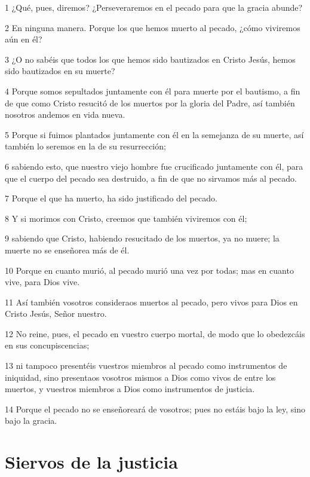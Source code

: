\par 1 ¿Qué, pues, diremos? ¿Perseveraremos en el pecado para que la gracia abunde?
\par 2 En ninguna manera. Porque los que hemos muerto al pecado, ¿cómo viviremos aún en él?
\par 3 ¿O no sabéis que todos los que hemos sido bautizados en Cristo Jesús, hemos sido bautizados en su muerte?
\par 4 Porque somos sepultados juntamente con él para muerte por el bautismo, a fin de que como Cristo resucitó de los muertos por la gloria del Padre, así también nosotros andemos en vida nueva.
\par 5 Porque si fuimos plantados juntamente con él en la semejanza de su muerte, así también lo seremos en la de su resurrección;
\par 6 sabiendo esto, que nuestro viejo hombre fue crucificado juntamente con él, para que el cuerpo del pecado sea destruido, a fin de que no sirvamos más al pecado.
\par 7 Porque el que ha muerto, ha sido justificado del pecado.
\par 8 Y si morimos con Cristo, creemos que también viviremos con él;
\par 9 sabiendo que Cristo, habiendo resucitado de los muertos, ya no muere; la muerte no se enseñorea más de él.
\par 10 Porque en cuanto murió, al pecado murió una vez por todas; mas en cuanto vive, para Dios vive.
\par 11 Así también vosotros consideraos muertos al pecado, pero vivos para Dios en Cristo Jesús, Señor nuestro.
\par 12 No reine, pues, el pecado en vuestro cuerpo mortal, de modo que lo obedezcáis en sus concupiscencias;
\par 13 ni tampoco presentéis vuestros miembros al pecado como instrumentos de iniquidad, sino presentaos vosotros mismos a Dios como vivos de entre los muertos, y vuestros miembros a Dios como instrumentos de justicia.
\par 14 Porque el pecado no se enseñoreará de vosotros; pues no estáis bajo la ley, sino bajo la gracia.

\section*{Siervos de la justicia}


